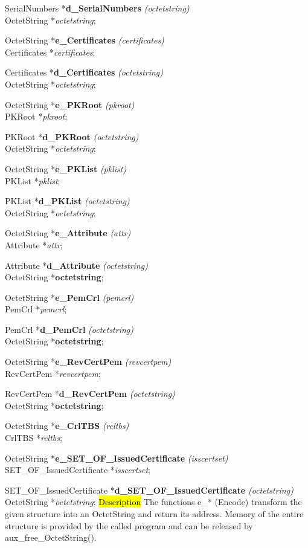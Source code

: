 SerialNumbers *{\bf d\_SerialNumbers} {\em (octetstring)} \\
OctetString *{\em octetstring};

OctetString *{\bf e\_Certificates} {\em (certificates)} \\
Certificates *{\em certificates};

Certificates *{\bf d\_Certificates} {\em (octetstring)} \\
OctetString *{\em octetstring};

OctetString *{\bf e\_PKRoot} {\em (pkroot)} \\
PKRoot *{\em pkroot};

PKRoot *{\bf d\_PKRoot} {\em (octetstring)} \\
OctetString *{\em octetstring};

OctetString *{\bf e\_PKList} {\em (pklist)} \\
PKList *{\em pklist};

PKList *{\bf d\_PKList} {\em (octetstring)} \\
OctetString *{\em octetstring};

OctetString *{\bf e\_Attribute} {\em (attr)} \\
Attribute *{\em attr};

Attribute *{\bf d\_Attribute} {\em (octetstring)} \\
OctetString *{\bf octetstring};

OctetString *{\bf e\_PemCrl} {\em (pemcrl)} \\
PemCrl *{\em pemcrl};

PemCrl *{\bf d\_PemCrl} {\em (octetstring)} \\
OctetString *{\bf octetstring};

OctetString *{\bf e\_RevCertPem} {\em (revcertpem)} \\
RevCertPem *{\em revcertpem};

RevCertPem *{\bf d\_RevCertPem} {\em (octetstring)} \\
OctetString *{\bf octetstring};

OctetString *{\bf e\_CrlTBS} {\em (rcltbs)} \\
CrlTBS *{\em rcltbs};

OctetString *{\bf e\_SET\_OF\_IssuedCertificate} {\em (isscertset)} \\
SET\_OF\_IssuedCertificate  *{\em isscertset};

SET\_OF\_IssuedCertificate  *{\bf d\_SET\_OF\_IssuedCertificate} {\em (octetstring)}
OctetString *{\em octetstring};
\hl{Description}     
The functions e\_* (Encode) transform the given structure into an OctetString
and return its address. Memory of the entire structure is provided 
by the called program and can be released
by aux\_free\_OctetString().

